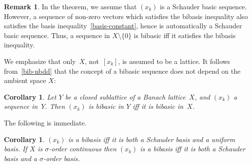 \documentclass[12pt]{amsart}
\theoremstyle{plain}
\newtheorem{corollary}[theorem]{Corollary}
\theoremstyle{definition}
\newtheorem{remark}[theorem]{Remark}
\begin{document}
\begin{remark}\label{bib-bib-ineq}
  In the theorem, we assume that $(x_k)$ is a Schauder basic
  sequence. However, a sequence of non-zero vectors which satisfies
  the bibasis inequality also satisfies the basis
  inequality~\eqref{basis-constant}, hence is automatically a Schauder
  basic sequence. Thus, a sequence in $X\setminus\{0\}$ is bibasic iff
  it satisfies the bibasis inequality.
\end{remark}

We emphasize that only~$X$, not~$[x_k]$, is assumed to be a
lattice. It follows from~\eqref{bib-nbdd} that the concept of a
bibasic sequence does not depend on the ambient space $X$:

\begin{corollary}\label{ambient}
  Let $Y$ be a closed sublattice of a Banach lattice~$X$, and $(x_k)$
  a sequence in~$Y$. Then $(x_k)$ is bibasic in $Y$ iff it is bibasic
  in~$X$. 
\end{corollary}

The following is immediate.

\begin{corollary}\label{Sch-unif}
  $(x_k)$ is a bibasis iff it is both a Schauder basis and a uniform
  basis. If $X$ is $\sigma$-order continuous then $(x_k)$ is a bibasis
  iff it is both a Schauder basis and a $\sigma$-order basis.
\end{corollary}




\end{document}
